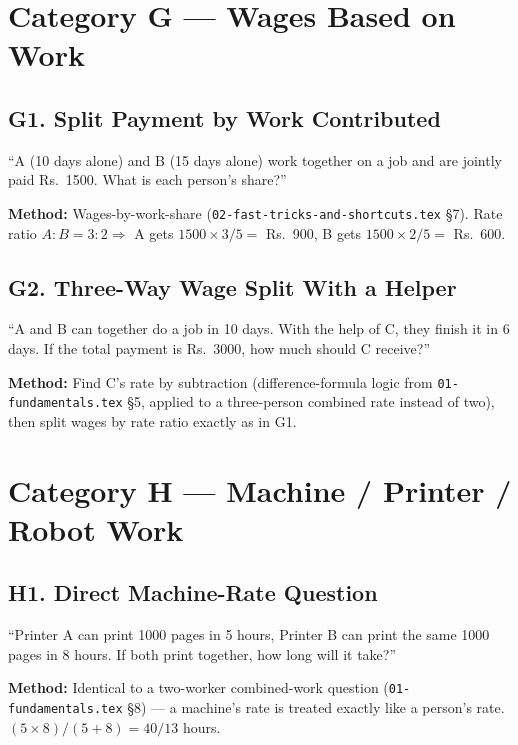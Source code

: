 \documentclass[11pt]{article}
\begin{document}
\section*{Category G --- Wages Based on Work}

\subsection*{G1. Split Payment by Work Contributed}
\begin{tipbox}[Phrasing]
``A (10 days alone) and B (15 days alone) work together on a job and are jointly paid Rs.~1500. What is
each person's share?''
\end{tipbox}
\textbf{Method:} Wages-by-work-share (\texttt{02-fast-tricks-and-shortcuts.tex} \S7). Rate ratio
$A:B=3:2 \Rightarrow$ A gets $1500\times3/5=$ Rs.~900, B gets $1500\times2/5=$ Rs.~600.

\subsection*{G2. Three-Way Wage Split With a Helper}
\begin{tipbox}[Phrasing]
``A and B can together do a job in 10 days. With the help of C, they finish it in 6 days. If the
total payment is Rs.~3000, how much should C receive?''
\end{tipbox}
\textbf{Method:} Find C's rate by subtraction (difference-formula logic from
\texttt{01-fundamentals.tex} \S5, applied to a three-person combined rate instead of two), then split
wages by rate ratio exactly as in G1.

\section*{Category H --- Machine / Printer / Robot Work}

\subsection*{H1. Direct Machine-Rate Question}
\begin{tipbox}[Phrasing]
``Printer A can print 1000 pages in 5 hours, Printer B can print the same 1000 pages in 8 hours. If
both print together, how long will it take?''
\end{tipbox}
\textbf{Method:} Identical to a two-worker combined-work question (\texttt{01-fundamentals.tex} \S8)
--- a machine's rate is treated exactly like a person's rate. $(5\times8)/(5+8)=40/13$ hours.
\end{document}
